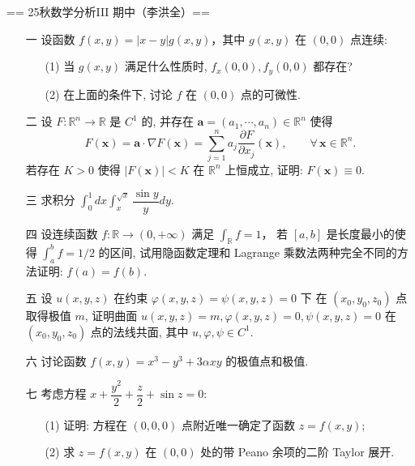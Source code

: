 == 25秋数学分析III 期中（李洪全）==
\begin{enumerate}
\item[一] 设函数 $f(x, y) = |x - y|g(x, y)$，其中 $g(x, y)$ 在 $(0, 0)$ 点连续:
\begin{enumerate}
    \item[(1)] 当 $g(x, y)$ 满足什么性质时, $f_{x}(0, 0), f_{y}(0, 0)$ 都存在?
    \item[(2)] 在上面的条件下, 讨论 $f$ 在 $(0, 0)$ 点的可微性.
\end{enumerate}

\item[二] 设 $F: \mathbb{R}^{n} \rightarrow \mathbb{R}$ 是 $C^{1}$ 的, 
并存在 $\boldsymbol{a} = (a_{1}, \cdots, a_{n}) \in \mathbb{R}^{n}$ 使得
\[
    F(\boldsymbol{x}) = \boldsymbol{a} \cdot \nabla F(\boldsymbol{x})
    = \sum_{j=1}^{n}a_{j}\dfrac{\partial F}{\partial x_{j}}(\boldsymbol{x}),
    \qquad \forall\, \boldsymbol{x} \in \mathbb{R}^{n}.
\]
若存在 $K > 0$ 使得 $|F(\boldsymbol{x})| < K$ 在 $\mathbb{R}^{n}$ 上恒成立, 证明: $F(\boldsymbol{x}) \equiv 0$.

\item[三] 求积分 $\displaystyle\int_{0}^{1}d x \int_{x}^{\sqrt{x}}\dfrac{\sin y}{y} d y$.

\item[四] 设连续函数 $f: \mathbb{R} \rightarrow (0, +\infty)$ 满足 $\int_{\mathbb{R}}f = 1$，
若 $[a, b]$ 是长度最小的使得 $\int_{a}^{b}f = 1/2$ 的区间, 
试用隐函数定理和 Lagrange 乘数法两种完全不同的方法证明: $f(a) = f(b)$.

\item[五] 设 $u(x, y, z)$ 在约束 $\varphi(x, y, z) = \psi(x, y, z) = 0$ 下
在 $(x_{0}, y_{0}, z_{0})$ 点取得极值 $m$, 证明曲面 $u(x, y, z) = m, \varphi(x, y, z) = 0, \psi(x, y, z) = 0$ 
在 $(x_{0}, y_{0}, z_{0})$ 点的法线共面, 其中 $u, \varphi, \psi \in C^{1}$.

\item[六] 讨论函数 $f(x, y) = x^{3} - y^{3} + 3\alpha xy$ 的极值点和极值.

\item[七] 考虑方程 $x + \dfrac{y^{2}}{2} + \dfrac{z}{2} + \sin z = 0$:
\begin{enumerate}
    \item[(1)] 证明: 方程在 $(0, 0, 0)$ 点附近唯一确定了函数 $z = f(x, y)$;
    \item[(2)] 求 $z = f(x, y)$ 在 $(0, 0)$ 处的带 Peano 余项的二阶 Taylor 展开.
\end{enumerate}


\end{enumerate}

